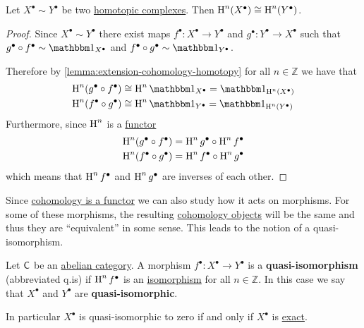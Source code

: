 \documentclass[../../main]{subfiles}
\begin{document}
\begin{corollary}\label{cor:homotopy-preserves-cohomology}
  Let \(X^{\bullet} \sim Y^{\bullet}\) be two \hyperref[def:homotopy]{homotopic complexes}.
  Then \(\operatorname{H}^{n}(X^{\bullet}) \cong \operatorname{H}^{n}(Y^{\bullet})\).
\end{corollary}
\begin{proof}
  Since \(X^{\bullet} \sim Y^{\bullet}\) there exist maps \(f^{\bullet}: X^{\bullet} \to Y^{\bullet}\) and \(g^{\bullet}: Y^{\bullet} \to X^{\bullet}\) such that \(g^{\bullet} \circ f^{\bullet} \sim \id_{X^{\bullet}}\) and \(f^{\bullet} \circ g^{\bullet} \sim \id_{Y^{\bullet}}\).

  Therefore by \autoref{lemma:extension-cohomology-homotopy} for all \(n \in \mathbb{Z}\) we have that
  \begin{align*}
    \cohomology{n}(g^{\bullet} \circ f^{\bullet}) &\cong \cohomology{n} \id_{X^{\bullet}} = \id_{\cohomology{n}(X^{\bullet})} \\
    \cohomology{n}(f^{\bullet} \circ g^{\bullet}) &\cong \cohomology{n} \id_{Y^{\bullet}} = \id_{\cohomology{n}(Y^{\bullet})} 
  \end{align*}
  Furthermore, since \(\operatorname{H}^{n}\) is a \hyperref[def:functor]{functor}
  \begin{align*}
    \operatorname{H}^{n}(g^{\bullet} \circ f^{\bullet}) &= \operatorname{H}^{n}g^{\bullet} \circ \operatorname{H}^{n}f^{\bullet} \\
    \operatorname{H}^{n}(f^{\bullet} \circ g^{\bullet}) &= \operatorname{H}^{n}f^{\bullet} \circ \operatorname{H}^{n}g^{\bullet} 
  \end{align*}
  which means that \(\operatorname{H}^{n}f^{\bullet}\) and \(\operatorname{H}^{n}g^{\bullet}\) are inverses of each other.
\end{proof}

Since \hyperref[def:cohomology]{cohomology is a functor} we can also study how it acts on morphisms.
For some of these morphisms, the resulting \hyperref[def:cohomology]{cohomology objects} will be the same and thus they are ``equivalent'' in some sense.
This leads to the notion of a quasi-isomorphism.
\begin{definition}\label{def:quasi-isomorphism}
  Let \(\mathsf{C}\) be an \hyperref[def:abelian-category]{abelian category}.
  A morphism \(f^{\bullet}\colon X^{\bullet} \to Y^{\bullet}\) is a \textbf{quasi-isomorphism} (abbreviated q.is) if \(\operatorname{H}^{n}f^{\bullet}\) is an \hyperref[def:categorical-isomorphism]{isomorphism} for all \(n \in \mathbb{Z}\).
  In this case we say that \(X^{\bullet}\) and \(Y^{\bullet}\) are \textbf{quasi-isomorphic}.

  In particular \(X^{\bullet}\) is quasi-isomorphic to zero if and only if \(X^{\bullet}\) is \hyperref[def:exact-sequence]{exact}.
\end{definition}
\end{document}
